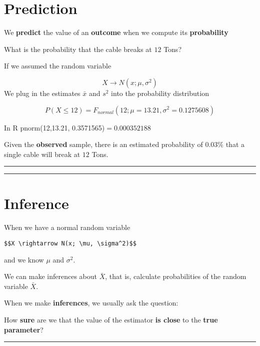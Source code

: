 \documentclass[
]{book}
\begin{document}
\hypertarget{prediction}{%
\section{Prediction}\label{prediction}}

We \textbf{predict} the value of an \textbf{outcome} when we compute its \textbf{probability}

What is the probability that the cable breaks at \(12\) Tons?

If we assumed the random variable

\[X \rightarrow N(x; \mu, \sigma^2)\]
We plug in the estimates \(\bar{x}\) and \(s^2\) into the probability distribution

\[P(X \leq 12)= F_{normal}(12; \mu=13.21, \sigma^2=0.1275608)\]

In R pnorm(12,13.21, 0.3571565)\(=0.000352188\)

Given the \textbf{observed} sample, there is an estimated probability of \(0.03\%\) that a single cable will break at \(12\) Tons.

\begin{center}\rule{0.5\linewidth}{0.5pt}\end{center}

\begin{center}\rule{0.5\linewidth}{0.5pt}\end{center}

\hypertarget{inference}{%
\section{Inference}\label{inference}}

When we have a normal random variable

\begin{verbatim}
$$X \rightarrow N(x; \mu, \sigma^2)$$
\end{verbatim}

and we know \(\mu\) and \(\sigma^2\).

We can make inferences about \(\bar{X}\), that is, calculate probabilities of the random variable \(\bar{X}\).

When we make \textbf{inferences}, we usually ask the question:

How \textbf{sure} are we that the value of the estimator \textbf{is close} to the \textbf{true parameter}?

\begin{center}\rule{0.5\linewidth}{0.5pt}\end{center}
\end{document}
